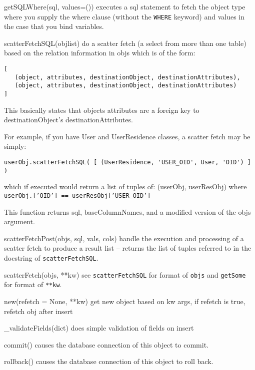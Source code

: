 \documentclass[titlepage]{manual}
\begin{document}
\begin{argdesc}
\item[getSQLWhere(sql, values=())] executes a sql statement to fetch
the object type where you supply the where clause (without the
\texttt{WHERE} keyword) and values in the case that you bind
variables.

\item[scatterFetchSQL(objlist)] do a scatter fetch (a select from more than one table) based
        on the relation information in objs which is of the form:
\begin{verbatim}
[
   (object, attributes, destinationObject, destinationAttributes),
   (object, attributes, destinationObject, destinationAttributes)
]
\end{verbatim}

        This basically states that objects attributes are a foreign key to
        destinationObject's destinationAttributes.

        For example, if you have User and UserResidence classes, a scatter
        fetch may be simply:
\begin{verbatim}
userObj.scatterFetchSQL( [ (UserResidence, 'USER_OID', User, 'OID') ] )
\end{verbatim}
        which if executed would return a list of tuples of:
            (userObj, userResObj)
        where \texttt{userObj.['OID'] == userResObj['USER_OID']}

        This function returns sql, baseColumnNames, and a modified version of
        the objs argument.
\item[scatterFetchPost(objs, sql, vals, cols)] handle the execution
and processing of a scatter fetch to produce a result list -- returns
the list of tuples referred to in the docstring of \texttt{scatterFetchSQL}.
\item[scatterFetch(objs, **kw)] see \texttt{scatterFetchSQL} for
format of \texttt{objs} and \texttt{getSome} for format of
\texttt{**kw}.

\item[new(refetch = None, **kw)] get new object based on kw args, if
refetch is true, refetch obj after insert
\item[_validateFields(dict)] does simple validation of fields on
insert
\item[commit()] causes the database connection of this object to
commit.
\item[rollback()]  causes the database connection of this object to
roll back.
\end{argdesc}
\end{document}
